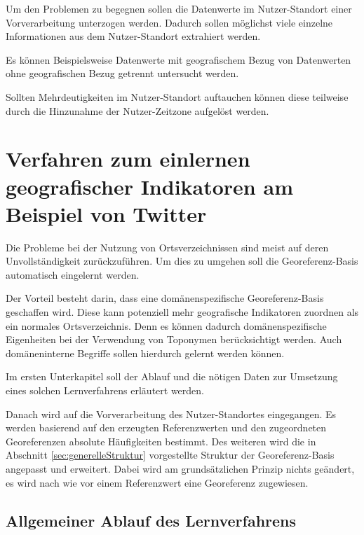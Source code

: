			Um den Problemen zu begegnen sollen die Datenwerte im Nutzer-Standort einer Vorverarbeitung unterzogen werden. 
			Dadurch sollen möglichst viele einzelne Informationen aus dem Nutzer-Standort extrahiert werden.

			Es können Beispielsweise Datenwerte mit geografischem Bezug von Datenwerten ohne geografischen Bezug getrennt untersucht werden.

			Sollten Mehrdeutigkeiten im Nutzer-Standort auftauchen können diese teilweise durch die Hinzunahme der Nutzer-Zeitzone aufgelöst werden.

	\section{Verfahren zum einlernen geografischer Indikatoren am Beispiel von Twitter} 

		Die Probleme bei der Nutzung von Ortsverzeichnissen sind meist auf deren Unvollständigkeit zurückzuführen. 
		Um dies zu umgehen soll die Georeferenz-Basis automatisch eingelernt werden. 

		Der Vorteil besteht darin, dass eine domänenspezifische Georeferenz-Basis geschaffen wird.
		Diese kann potenziell mehr geografische Indikatoren zuordnen als ein normales Ortsverzeichnis.
		Denn es können dadurch domänenspezifische Eigenheiten bei der Verwendung von Toponymen berücksichtigt werden. 
		Auch domäneninterne Begriffe sollen hierdurch gelernt werden können.

		Im ersten Unterkapitel soll der Ablauf und die nötigen Daten zur Umsetzung eines solchen Lernverfahrens erläutert werden.

		Danach wird auf die Vorverarbeitung des Nutzer-Standortes eingegangen.
		Es werden basierend auf den erzeugten Referenzwerten und den zugeordneten Georeferenzen absolute Häufigkeiten bestimmt.
		Des weiteren wird die in Abschnitt \ref{sec:generelleStruktur} vorgestellte Struktur der Georeferenz-Basis angepasst und erweitert.
		Dabei wird am grundsätzlichen Prinzip nichts geändert, es wird nach wie vor einem Referenzwert eine Georeferenz zugewiesen. 

		\subsection{Allgemeiner Ablauf des Lernverfahrens}

